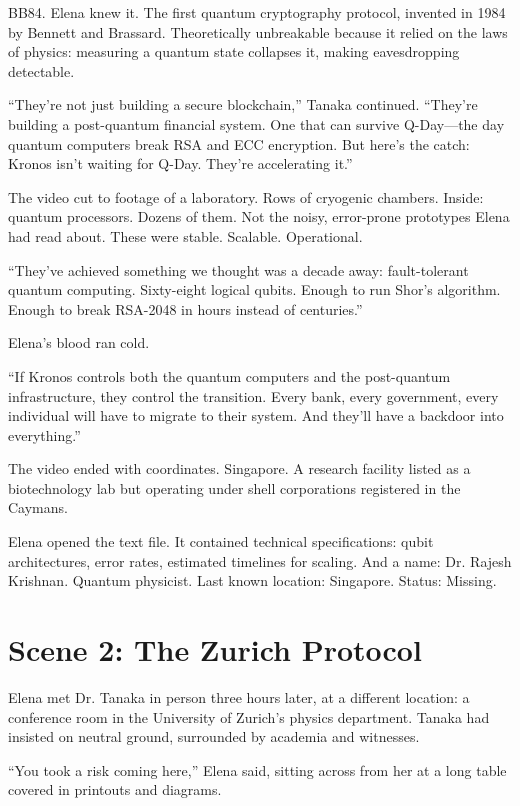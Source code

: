 \documentclass[12pt,oneside]{book}
\begin{document}
BB84. Elena knew it. The first quantum cryptography protocol, invented in 1984 by Bennett and Brassard. Theoretically unbreakable because it relied on the laws of physics: measuring a quantum state collapses it, making eavesdropping detectable.

``They're not just building a secure blockchain,'' Tanaka continued. ``They're building a post-quantum financial system. One that can survive Q-Day—the day quantum computers break RSA and ECC encryption. But here's the catch: Kronos isn't waiting for Q-Day. They're accelerating it.''

The video cut to footage of a laboratory. Rows of cryogenic chambers. Inside: quantum processors. Dozens of them. Not the noisy, error-prone prototypes Elena had read about. These were stable. Scalable. Operational.

``They've achieved something we thought was a decade away: fault-tolerant quantum computing. Sixty-eight logical qubits. Enough to run Shor's algorithm. Enough to break RSA-2048 in hours instead of centuries.''

Elena's blood ran cold.

``If Kronos controls both the quantum computers and the post-quantum infrastructure, they control the transition. Every bank, every government, every individual will have to migrate to their system. And they'll have a backdoor into everything.''

The video ended with coordinates. Singapore. A research facility listed as a biotechnology lab but operating under shell corporations registered in the Caymans.

Elena opened the text file. It contained technical specifications: qubit architectures, error rates, estimated timelines for scaling. And a name: Dr. Rajesh Krishnan. Quantum physicist. Last known location: Singapore. Status: Missing.

\section*{Scene 2: The Zurich Protocol}

Elena met Dr. Tanaka in person three hours later, at a different location: a conference room in the University of Zurich's physics department. Tanaka had insisted on neutral ground, surrounded by academia and witnesses.

``You took a risk coming here,'' Elena said, sitting across from her at a long table covered in printouts and diagrams.
\end{document}
